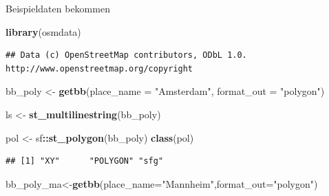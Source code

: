 \documentclass[ignorenonframetext,]{beamer}
\newenvironment{Shaded}{\begin{snugshade}}{\end{snugshade}}
\newcommand{\DataTypeTok}[1]{\textcolor[rgb]{0.13,0.29,0.53}{#1}}
\newcommand{\KeywordTok}[1]{\textcolor[rgb]{0.13,0.29,0.53}{\textbf{#1}}}
\newcommand{\NormalTok}[1]{#1}
\newcommand{\OperatorTok}[1]{\textcolor[rgb]{0.81,0.36,0.00}{\textbf{#1}}}
\newcommand{\StringTok}[1]{\textcolor[rgb]{0.31,0.60,0.02}{#1}}
\begin{document}
\begin{frame}[fragile]{Beispieldaten bekommen}
\protect\hypertarget{beispieldaten-bekommen}{}

\begin{Shaded}
\begin{Highlighting}[]
\KeywordTok{library}\NormalTok{(osmdata)}
\end{Highlighting}
\end{Shaded}

\begin{verbatim}
## Data (c) OpenStreetMap contributors, ODbL 1.0. http://www.openstreetmap.org/copyright
\end{verbatim}

\begin{Shaded}
\begin{Highlighting}[]
\NormalTok{bb_poly <-}\StringTok{ }\KeywordTok{getbb}\NormalTok{(}\DataTypeTok{place_name =} \StringTok{"Amsterdam"}\NormalTok{, }
                 \DataTypeTok{format_out =} \StringTok{"polygon"}\NormalTok{)}
\end{Highlighting}
\end{Shaded}

\begin{Shaded}
\begin{Highlighting}[]
\NormalTok{ls <-}\StringTok{ }\KeywordTok{st_multilinestring}\NormalTok{(bb_poly)}
\end{Highlighting}
\end{Shaded}

\begin{Shaded}
\begin{Highlighting}[]
\NormalTok{pol <-}\StringTok{ }\NormalTok{sf}\OperatorTok{::}\KeywordTok{st_polygon}\NormalTok{(bb_poly)}
\KeywordTok{class}\NormalTok{(pol)}
\end{Highlighting}
\end{Shaded}

\begin{verbatim}
## [1] "XY"      "POLYGON" "sfg"
\end{verbatim}

\begin{Shaded}
\begin{Highlighting}[]
\NormalTok{bb_poly_ma<-}\KeywordTok{getbb}\NormalTok{(}\DataTypeTok{place_name=}\StringTok{"Mannheim"}\NormalTok{,}\DataTypeTok{format_out=}\StringTok{"polygon"}\NormalTok{)}
\end{Highlighting}
\end{Shaded}

\end{frame}
\end{document}
